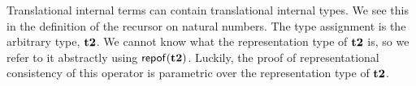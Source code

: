 %
%

Translational internal terms can contain translational internal types. We see this in the definition of the recursor on natural numbers. The type assignment is the arbitrary type, ${\textbf{t2}}$. We cannot know what the representation type of ${\textbf{t2}}$ is, so we refer to it abstractly using ${\sf repof}({\textbf{t2}})$. Luckily, the proof of representational consistency of this operator is parametric over the representation type of ${\textbf{t2}}$. 


